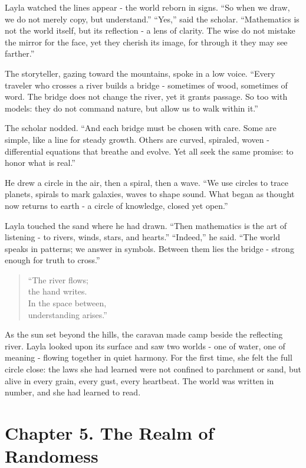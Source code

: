 \documentclass[
  letterpaper,
  DIV=11,
  numbers=noendperiod]{scrreprt}
\begin{document}
Layla watched the lines appear - the world reborn in signs. ``So when we
draw, we do not merely copy, but understand.'' ``Yes,'' said the
scholar. ``Mathematics is not the world itself, but its reflection - a
lens of clarity. The wise do not mistake the mirror for the face, yet
they cherish its image, for through it they may see farther.''

The storyteller, gazing toward the mountains, spoke in a low voice.
``Every traveler who crosses a river builds a bridge - sometimes of
wood, sometimes of word. The bridge does not change the river, yet it
grants passage. So too with models: they do not command nature, but
allow us to walk within it.''

The scholar nodded. ``And each bridge must be chosen with care. Some are
simple, like a line for steady growth. Others are curved, spiraled,
woven - differential equations that breathe and evolve. Yet all seek the
same promise: to honor what is real.''

He drew a circle in the air, then a spiral, then a wave. ``We use
circles to trace planets, spirals to mark galaxies, waves to shape
sound. What began as thought now returns to earth - a circle of
knowledge, closed yet open.''

Layla touched the sand where he had drawn. ``Then mathematics is the art
of listening - to rivers, winds, stars, and hearts.'' ``Indeed,'' he
said. ``The world speaks in patterns; we answer in symbols. Between them
lies the bridge - strong enough for truth to cross.''

\begin{quote}
``The river flows;\\
the hand writes.\\
In the space between,\\
understanding arises.''
\end{quote}

As the sun set beyond the hills, the caravan made camp beside the
reflecting river. Layla looked upon its surface and saw two worlds - one
of water, one of meaning - flowing together in quiet harmony. For the
first time, she felt the full circle close: the laws she had learned
were not confined to parchment or sand, but alive in every grain, every
gust, every heartbeat. The world was written in number, and she had
learned to read.

\section{Chapter 5. The Realm of
Randomess}\label{chapter-5.-the-realm-of-randomess}
\end{document}
